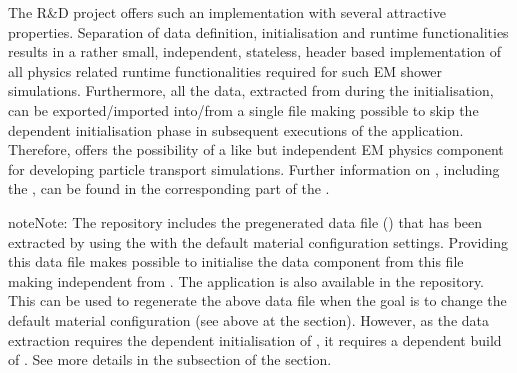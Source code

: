 \documentclass[letterpaper,10pt,english]{sphinxmanual}
\begin{document}
\sphinxAtStartPar
The  R\&D project  offers such an implementation with several attractive properties. Separation of data definition,
initialisation and run\sphinxhyphen{}time functionalities results in a rather small,  independent, stateless, header based implementation of all
physics related run\sphinxhyphen{}time functionalities required for such EM shower simulations. Furthermore, all the data, extracted from  during
the initialisation, can be exported/imported into/from a single file making possible to skip the  dependent initialisation phase
in subsequent executions of the application. Therefore,  offers the possibility of a  like but 
independent EM physics component for developing particle transport simulations. Further information on , including the
,
can be found in the corresponding part of the  .

\begin{sphinxadmonition}{note}{Note:}
\sphinxAtStartPar
The  repository includes the pre\sphinxhyphen{}generated data file () that has been extracted by using the
 with the default material configuration settings. Providing this data file makes possible
to initialise the  data component from this file making  independent from . The 
application is also available in the  repository. This can be used to re\sphinxhyphen{}generate the above data file when the goal is to change
the default material configuration (see above at the {\hyperref[\detokenize{IntroAndInstall/components:geometry}]{}} section). However, as the data extraction requires the  dependent
initialisation of , it requires a  dependent build of . See more details in the
 subsection of the  section.
\end{sphinxadmonition}
\end{document}
